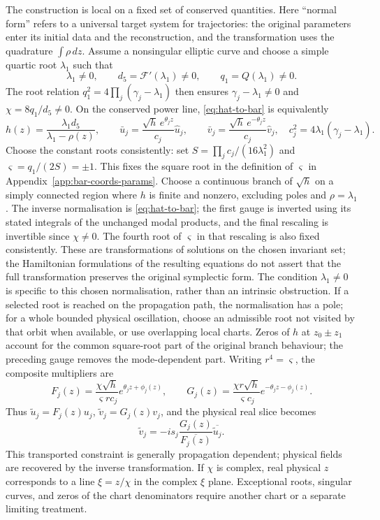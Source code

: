 \documentclass[11pt,a4paper]{article}
\numberwithin{equation}{section}
\begin{document}
The construction is local on a fixed set of conserved quantities.
Here ``normal form'' refers to a universal target system for trajectories: the original parameters enter its initial data and the reconstruction, and the transformation uses the quadrature $\int\rho\,dz$.
Assume a nonsingular elliptic curve and choose a simple quartic root $\lambda_1$ such that
\begin{equation}
\lambda_1\ne0,\qquad d_5=\mathcal F'(\lambda_1)\ne0,\qquad
q_1=Q(\lambda_1)\ne0.
\end{equation}
The root relation $q_1^2=4\prod_j(\gamma_j-\lambda_1)$ then ensures $\gamma_j-\lambda_1\ne0$ and $\chi=8q_1/d_5\ne0$.
On the conserved power line, \eqref{eq:hat-to-bar} is equivalently
\begin{equation}
h(z)=\frac{\lambda_1d_5}{\lambda_1-\rho(z)},\qquad
\bar u_j=\frac{\sqrt h\,e^{\theta_jz}}{c_j}\hat u_j,\qquad
\bar v_j=\frac{\sqrt h\,e^{-\theta_jz}}{c_j}\hat v_j,
\quad c_j^2=4\lambda_1(\gamma_j-\lambda_1).
\label{eq:local-inverse-normalisation}
\end{equation}
Choose the constant roots consistently: set $S=\prod_jc_j/(16\lambda_1^2)$ and $\varsigma=q_1/(2S)=\pm1$.
This fixes the square root in the definition of $\varsigma$ in Appendix~\ref{app:bar-coords-params}.
Choose a continuous branch of $\sqrt h$ on a simply connected region where $h$ is finite and nonzero, excluding poles and $\rho=\lambda_1$.
The inverse normalisation is \eqref{eq:hat-to-bar}; the first gauge is inverted using its stated integrals of the unchanged modal products, and the final rescaling is invertible since $\chi\ne0$.
The fourth root of $\varsigma$ in that rescaling is also fixed consistently.
These are transformations of solutions on the chosen invariant set; the Hamiltonian formulations of the resulting equations do not assert that the full transformation preserves the original symplectic form.
The condition $\lambda_1\ne0$ is specific to this chosen normalisation, rather than an intrinsic obstruction.
If a selected root is reached on the propagation path, the normalisation has a pole; for a whole bounded physical oscillation, choose an admissible root not visited by that orbit when available, or use overlapping local charts.
Zeros of $h$ at $z_0\pm z_1$ account for the common square-root part of the original branch behaviour; the preceding gauge removes the mode-dependent part.
Writing $r^4=\varsigma$, the composite multipliers are
\begin{equation}
F_j(z)=\frac{\chi\sqrt h}{\varsigma r c_j}e^{\theta_jz+\phi_j(z)},\qquad
G_j(z)=\frac{\chi r\sqrt h}{\varsigma c_j}e^{-\theta_jz-\phi_j(z)}.
\end{equation}
Thus $\tilde u_j=F_j(z)u_j$, $\tilde v_j=G_j(z)v_j$, and the physical real slice becomes
\begin{equation}
\tilde v_j=-is_j\frac{G_j(z)}{\overline{F_j(z)}}\overline{\tilde u_j}.
\end{equation}
This transported constraint is generally propagation dependent; physical fields are recovered by the inverse transformation.
If $\chi$ is complex, real physical $z$ corresponds to a line $\xi=z/\chi$ in the complex $\xi$ plane.
Exceptional roots, singular curves, and zeros of the chart denominators require another chart or a separate limiting treatment.
\end{document}
